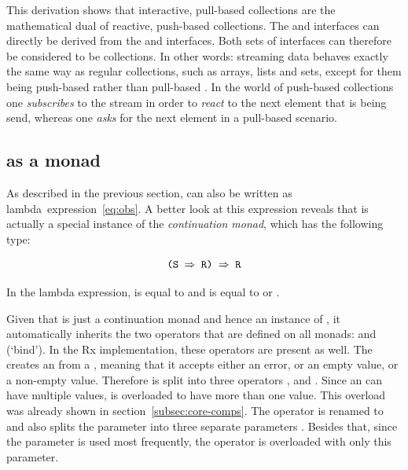 
This derivation shows that interactive, pull-based collections are the mathematical dual of reactive, push-based collections. The \obs and \obv interfaces can directly be derived from the \ieb and \ier interfaces. Both sets of interfaces can therefore be considered to be collections. In other words: streaming data behaves exactly the same way as regular collections, such as arrays, lists and sets, except for them being push-based rather than pull-based \cite{meijer2012-YMIAD, meijer2010-Observable}. In the world of push-based collections one \emph{subscribes} to the stream in order to \emph{react} to the next element that is being send, whereas one \emph{asks} for the next element in a pull-based scenario.

\subsection{\obs as a monad}
\label{subsec:obs-monad}
As described in the previous section, \obs can also be written as lambda~expression~\ref{eq:obs}. A better look at this expression reveals that \obs is actually a special instance of the \textit{continuation monad}, which has the following type:

\begin{equation} \label{eq:cont}
\code{(S $\Rightarrow$ R) $\Rightarrow$ R}
\end{equation}

In the \obs lambda expression,  is equal to  and  is equal to \code{()} or .

Given that \obs is just a continuation monad and hence an instance of , it automatically inherits the two operators that are defined on all monads:  and \code{(>>=)} (`bind'). In the Rx implementation, these operators are present as well. The  creates an \obs from a , meaning that it accepts either an error, or an empty value, or a non-empty value. Therefore  is split into three operators ,  and . Since an \obs can have multiple values,  is overloaded to have more than one value. This overload was already shown in section~\ref{subsec:core-comps}. The \code{(>>=)} operator is renamed to  and also splits the  parameter into three separate parameters \cite{rx-api}. Besides that, since the  parameter is used most frequently, the  operator is overloaded with only this parameter.

